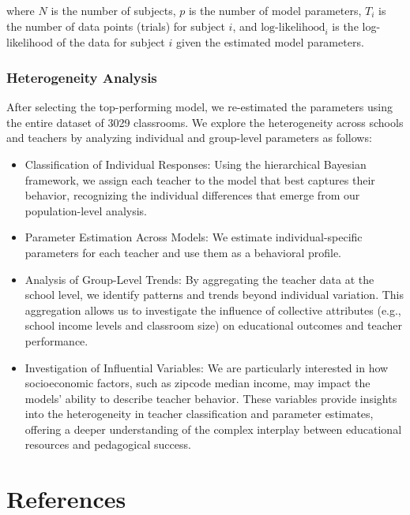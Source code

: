 \documentclass[
  number,
  preprint,
  3p,
  onecolumn]{elsarticle}
\begin{document}
where \(N\) is the number of subjects, \(p\) is the number of model
parameters, \(T_i\) is the number of data points (trials) for subject
\(i\), and \(\text{log-likelihood}_i\) is the log-likelihood of the data
for subject \(i\) given the estimated model parameters.

\subsubsection{Heterogeneity Analysis}\label{heterogeneity-analysis}

After selecting the top-performing model, we re-estimated the parameters
using the entire dataset of 3029 classrooms. We explore the
heterogeneity across schools and teachers by analyzing individual and
group-level parameters as follows:

\begin{itemize}
\item
  Classification of Individual Responses: Using the hierarchical
  Bayesian framework, we assign each teacher to the model that best
  captures their behavior, recognizing the individual differences that
  emerge from our population-level analysis.
\item
  Parameter Estimation Across Models: We estimate individual-specific
  parameters for each teacher and use them as a behavioral profile.
\item
  Analysis of Group-Level Trends: By aggregating the teacher data at the
  school level, we identify patterns and trends beyond individual
  variation. This aggregation allows us to investigate the influence of
  collective attributes (e.g., school income levels and classroom size)
  on educational outcomes and teacher performance.
\item
  Investigation of Influential Variables: We are particularly interested
  in how socioeconomic factors, such as zipcode median income, may
  impact the models' ability to describe teacher behavior. These
  variables provide insights into the heterogeneity in teacher
  classification and parameter estimates, offering a deeper
  understanding of the complex interplay between educational resources
  and pedagogical success.
\end{itemize}

\section{References}\label{references}

\renewcommand{\bibsection}{}

\end{document}
